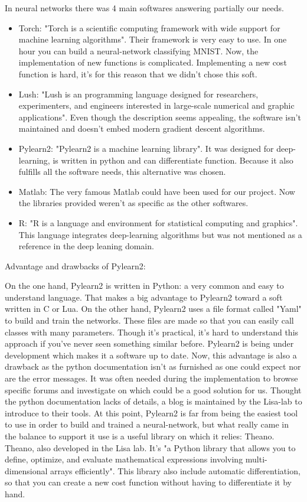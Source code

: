 		In neural networks there was 4 main softwares answering partially our needs.
		\begin{itemize}
			\item Torch: "Torch is a scientific computing framework with wide support for machine learning algorithms". Their framework is very easy to use. In one hour you can build a neural-network classifying MNIST. Now, the implementation of new functions is complicated. Implementing a new cost function is hard, it's for this reason that we didn't chose this soft.
			\item Lush: "Lush is an programming language designed for researchers, experimenters, and engineers interested in large-scale numerical and graphic applications". Even though the description seems appealing, the software isn't maintained and doesn't embed modern gradient descent algorithms. 
			\item Pylearn2: "Pylearn2 is a machine learning library". It was designed for deep-learning, is written in python and can differentiate function. Because it also fulfills all the software needs, this alternative was chosen.
			\item Matlab: The very famous Matlab could have been used for our project. Now the libraries provided weren't as specific as the other softwares.
			\item R: "R is a language and environment for statistical computing and graphics". This language integrates deep-learning algorithms but was not mentioned as a reference in the deep leaning domain.
		\end{itemize}


		Advantage and drawbacks of Pylearn2:

		On the one hand, Pylearn2 is written in Python: a very common and easy to understand language. That makes a big advantage to Pylearn2 toward a soft written in C or Lua. On the other hand, Pylearn2 uses a file format called "Yaml" to build and train the networks. These files are made so that you can easily call classes with many parameters. Though it's practical, it's hard to understand this approach if you've never seen something similar before.
		Pylearn2 is being under development which makes it a software up to date. Now, this advantage is also a drawback as the python documentation isn't as furnished as one could expect nor are the error messages. It was often needed during the implementation to browse specific forums and investigate on which could be a good solution for us. Thought the python documentation lacks of details, a blog is maintained by the Lisa-lab to introduce to their tools.
		At this point, Pylearn2 is far from being the easiest tool to use in order to build and trained a neural-network, but what really came in the balance to support it use is a useful library on which it relies: Theano. Theano, also developed in the Lisa lab. It's "a Python library that allows you to define, optimize, and evaluate mathematical expressions involving multi-dimensional arrays efficiently". This library also include automatic differentiation, so that you can create a new cost function without having to differentiate it by hand.

